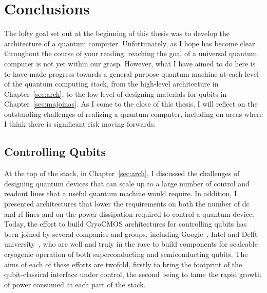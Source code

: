 \chapter{Conclusions}

The lofty goal set out at the beginning of this thesis was to develop the architecture of a quantum computer. Unfortunately,
as I hope has become clear throughout the course of your reading, reaching the goal of a universal quantum computer
is not yet within our grasp. However, what I have aimed to do here is to have made progress towards a general purpose quantum machine at each
level of the quantum computing stack, from the high-level architecture in Chapter~\ref{sec:arch}, to the low level
of designing materials for qubits in Chapter~\ref{sec:majoinas}. As I come to the close of this thesis, I will reflect on the outstanding
challenges of realizing a quantum computer, including on areas where I think there is significant risk moving forwards.

\section{Controlling Qubits}
At the top of the stack, in Chapter~\ref{sec:arch}, I discussed the challenges of designing quantum devices that can scale up to a large number of
control and readout lines that a useful quantum machine would require. In addition, I presented architectures that lower the
requirements on both the number of dc and rf lines and on the power dissipation required to control a quantum device. Today, the effort to build
CryoCMOS architectures for controlling qubits has been joined by several companies and groups, including Google~\cite{gcryocmos}, Intel and Delft university~\cite{VANDIJK201990},
who are well and truly in the race to build components for scaleable cryogenic operation of both superconducting and semiconducting qubits. The aims of each
of these efforts are twofold, firstly to bring the footprint of the qubit-classical interface under control, the second being
to tame the rapid growth of power consumed at each part of the stack.

